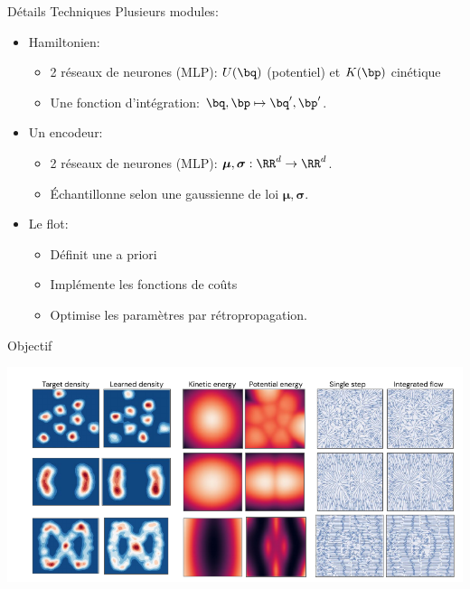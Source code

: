 \documentclass{beamer}
\begin{document}
\begin{frame}{Détails Techniques}
Plusieurs modules: 
\begin{itemize}
\item Hamiltonien:
\begin{itemize}
\item 2 réseaux de neurones (MLP): $U(\bq)$ (potentiel) et $K(\bp)$ cinétique
\item Une fonction d'intégration: $\bq, \bp \mapsto \bq', \bp'$.
\end{itemize}
\item Un encodeur:
\begin{itemize}
\item 2 réseaux de neurones (MLP): $\boldsymbol{\mu}, \boldsymbol{\sigma} : \RR^d \to \RR^d$.
\item Échantillonne selon une gaussienne de loi $\boldsymbol{\mu}, \boldsymbol{\sigma}$.
\end{itemize}
\item Le flot: 
\begin{itemize}
\item Définit une a priori
\item Implémente les fonctions de coûts 
\item Optimise les paramètres par rétropropagation.
\end{itemize}
\end{itemize}
\end{frame}

\begin{frame}{Objectif}
\begin{center}
\includegraphics[width=\linewidth]{samples/objective.png}
\end{center}

\end{frame}
\end{document}
